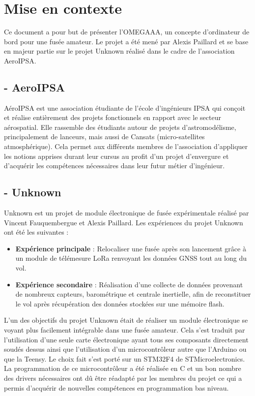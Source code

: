 \section*{Mise en contexte}

Ce document a pour but de présenter l'OMEGAAA, un concepte d'ordinateur de bord
pour une fusée amateur. Le projet a été mené par Alexis Paillard et se base en
majeur partie sur le projet Unknown réalisé dans le cadre de l'association
AeroIPSA.\\

\subsection*{- AeroIPSA}
AéroIPSA est une association étudiante de l'école d'ingénieurs IPSA qui conçoit et
réalise entièrement des projets fonctionnels en rapport avec le secteur
aérospatial. Elle rassemble des étudiants autour de projets d'astromodélisme,
principalement de lanceurs, mais aussi de Cansats (micro-satellites atmosphérique).
Cela permet aux différents membres de l'association d'appliquer les notions
apprises durant leur cursus au profit d'un projet d'envergure et d'acquérir les
compétences nécessaires dans leur futur métier d'ingénieur.\\

\subsection*{- Unknown}
Unknown est un projet de module électronique de fusée expérimentale réalisé par
Vincent Fauquembergue et Alexis Paillard. Les expériences du projet Unknown ont été
les suivantes :
\begin{itemize}
    \item \textbf{Expérience principale} : Relocaliser une fusée après son lancement
    grâce à un module de télémesure LoRa renvoyant les données GNSS tout au long du
    vol.
    \item \textbf{Expérience secondaire} : Réalisation d'une collecte de données
    provenant de nombreux capteurs, barométrique et centrale inertielle, afin de
    reconstituer le vol après récupération des données stockées sur une mémoire
    flash.
\end{itemize}
L'un des objectifs du projet Unknown était de réaliser un module électronique se
voyant plus facilement intégrable dans une fusée amateur. Cela s'est traduit par
l'utilisation d'une seule carte électronique ayant tous ses composants directement
soudés dessus ainsi que l'utilisation d'un microcontrôleur autre que l'Arduino ou
que la Teensy. Le choix fait s'est porté sur un STM32F4 de STMicroelectronics. La
programmation de ce microcontrôleur a été réalisée en C et un bon nombre des
drivers nécessaires ont dû être réadapté par les membres du projet ce qui a permis
d'acquérir de nouvelles compétences en programmation bas niveau.

